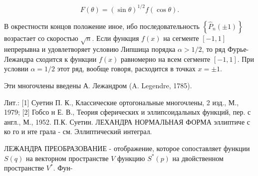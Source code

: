 \documentclass[10pt]{article}
\begin{document}
\[

F(\theta)=(\sin \theta)^{1 / 2} f(\cos \theta) .

\]



В окрестности концов положение иное, ибо последовательность $\left\{\hat{P}_{n}( \pm 1)\right\}$ возрастает со скоростью $\sqrt{n}$. Если функция $f(x)$ на сегменте $[-1,1]$ непрерывна и удовлетворяет условию Липшица порядка $\alpha>1 / 2$, то ряд Фурье-Лежандра сходится к функции $f(x)$ равномерно на всем сегменте $[-1,1]$. При условии $\alpha=1 / 2$ этот ряд, вообще говоря, расходится в точках $x= \pm 1$.



Эти многочлены введены А. Лежандром (A. Legendre, 1785).



Лит.: [1] Суетин П. К., Классические ортогональные многочлены, 2 изд., М., 1979; [2] Гобсо н Е. В., Теория сферических и эллипсоидальных функций, пер. с англ., М., 1952. П.К. Суетин. ЛЕХАНДРА НОРМАЛЬНАЯ ФОРМА эллиптиче с ко го и нте грала - см. Эллиптический интеграл.



ЛЕЖАНДРА ПРЕОБРАЗОВАНИЕ - отображение, которое сопоставляет функции $S(q)$ на векторном пространстве $V$ функцию $S^{*}(p)$ на двойственном пространстве $V^{*}$. Фун-
\end{document}
